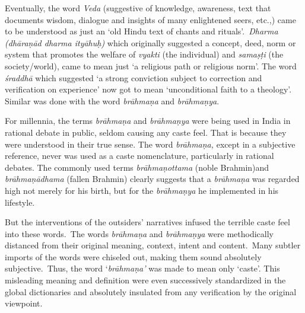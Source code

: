 Eventually, the word \textit{Veda} (suggestive of knowledge, awareness, text that documents wisdom, dialogue and insights of many enlightened seers, etc.,) came to be understood as just an ‘old Hindu text of chants and rituals’.~\textit{Dharma (dhāraṇād dharma ityāhuḥ)} which originally suggested a concept, deed, norm or system that promotes the welfare of \textit{vyakti} (the individual) and \textit{samaṣṭi} (the society/world), came to mean just ‘a religious path or religious norm’. The word \textit{śraddhā} which suggested ‘a strong conviction subject to correction and verification on experience’ now got to mean ‘unconditional faith to a theology’. Similar was done with the word \textit{brāhmaṇa} and \textit{brāhmaṇya}.

For millennia, the terms \textit{brāhmaṇa} and \textit{brāhmaṇya} were being used in India in rational debate in public, seldom causing any caste feel. That is because they were understood in their true sense. The word \textit{brāhmaṇa,} except in a subjective reference, never was used as a caste nomenclature, particularly in rational debates. The commonly used terms \textit{brāhmaṇottama} (noble Brahmin)and \textit{brāhmaṇādhama} (fallen Brahmin) clearly suggests that a \textit{brāhmaṇa} was regarded high not merely for his birth, but for the \textit{brāhmaṇya} he implemented in his lifestyle.

But the interventions of the outsiders’ narratives infused the terrible caste feel into these words.~The words \textit{brāhmaṇa} and \textit{brāhmaṇya} were methodically distanced from their original meaning, context, intent and content.~Many subtler imports of the words were chiseled out, making them sound absolutely subjective.~Thus, the word ‘\textit{brāhmaṇa’} was made to mean only ‘caste’. This misleading meaning and definition were even successively standardized in the global dictionaries and absolutely insulated from any verification by the original viewpoint.

